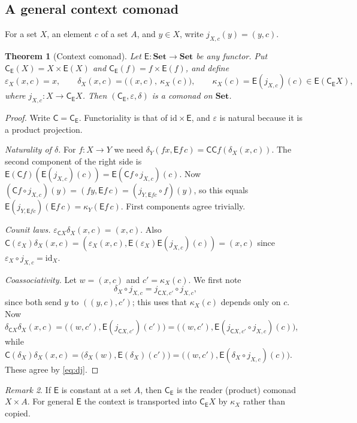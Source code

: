 \documentclass[11pt]{article}
\newtheorem{theorem}{Theorem}[section]
\theoremstyle{definition}
\theoremstyle{remark}
\newtheorem{remark}[theorem]{Remark}
\newcommand{\Set}{\mathbf{Set}}
\newcommand{\C}{\mathsf{C}}
\newcommand{\E}{\mathsf{E}}
\newcommand{\id}{\mathrm{id}}
\begin{document}
\subsection{A general context comonad}

For a set $X$, an element $c$ of a set $A$, and $y\in X$, write $j_{X,c}(y)=(y,c)$.

\begin{theorem}[Context comonad]\label{thm:context-comonad}
Let $\E\colon\Set\to\Set$ be any functor. Put $\C_\E(X)=X\times\E(X)$ and
$\C_\E(f)=f\times\E(f)$, and define
\[
\varepsilon_X(x,c)=x,\qquad
\delta_X(x,c)=\big((x,c),\ \kappa_X(c)\big),\qquad \kappa_X(c)=\E(j_{X,c})(c)\in\E(\C_\E X),
\]
where $j_{X,c}\colon X\to\C_\E X$. Then $(\C_\E,\varepsilon,\delta)$ is a comonad on $\Set$.
\end{theorem}
\begin{proof}
Write $\C=\C_\E$. Functoriality is that of $\mathrm{id}\times\E$, and $\varepsilon$ is natural
because it is a product projection.

\emph{Naturality of $\delta$.} For $f\colon X\to Y$ we need
$\delta_Y(fx,\E f\,c)=\C\C f(\delta_X(x,c))$. The second component of the right side is
$\E(\C f)(\E(j_{X,c})(c))=\E(\C f\circ j_{X,c})(c)$. Now
$(\C f\circ j_{X,c})(y)=(fy,\E f\,c)=(j_{Y,\E f c}\circ f)(y)$, so this equals
$\E(j_{Y,\E fc})(\E f\,c)=\kappa_Y(\E f\,c)$. First components agree trivially.

\emph{Counit laws.} $\varepsilon_{\C X}\delta_X(x,c)=(x,c)$. Also
$\C(\varepsilon_X)\delta_X(x,c)=(\varepsilon_X(x,c),\E(\varepsilon_X)\E(j_{X,c})(c))=(x,c)$ since
$\varepsilon_X\circ j_{X,c}=\id_X$.

\emph{Coassociativity.} Let $w=(x,c)$ and $c'=\kappa_X(c)$. We first note
\begin{equation}\label{eq:dj}
\delta_X\circ j_{X,c}=j_{\C X,c'}\circ j_{X,c},
\end{equation}
since both send $y$ to $((y,c),c')$; this uses that $\kappa_X(c)$ depends only on $c$. Now
$\delta_{\C X}\delta_X(x,c)=\big((w,c'),\E(j_{\C X,c'})(c')\big)
=\big((w,c'),\E(j_{\C X,c'}\circ j_{X,c})(c)\big)$, while
$\C(\delta_X)\delta_X(x,c)=\big(\delta_X(w),\E(\delta_X)(c')\big)
=\big((w,c'),\E(\delta_X\circ j_{X,c})(c)\big)$. These agree by \eqref{eq:dj}.
\end{proof}

\begin{remark}
If $\E$ is constant at a set $A$, then $\C_\E$ is the reader (product) comonad $X\times A$. For general
$\E$ the context is transported into $\C_\E X$ by $\kappa_X$ rather than copied.
\end{remark}
\end{document}
